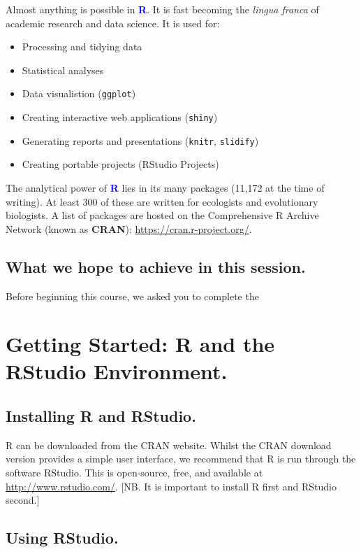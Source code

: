 \documentclass[a4paper,12pt]{article}
\newcommand\boldblue[1]{\textcolor{blue}{\textbf{#1}}}
\newcommand{\code}[1]{\texttt{#1}}
\begin{document}
Almost anything is possible in \boldblue{R}. It is fast becoming the \textit{lingua franca} of academic research and data science. It is used for:

\begin{itemize}
\item Processing and tidying data 
\item Statistical analyses
\item Data visualistion (\code{ggplot})
\item Creating interactive web applications (\code{shiny})
\item Generating reports and presentations (\code{knitr}, \code{slidify})
\item Creating portable projects (RStudio Projects)
\end{itemize}

The analytical power of \boldblue{R} lies in its many packages (11,172 at the time of writing). At least 300 of these are written for ecologists and evolutionary biologists. A list of packages are hosted on the Comprehensive R Archive Network (known as \textbf{CRAN}): \url{https://cran.r-project.org/}.

\subsection {What we hope to achieve in this session.}

Before beginning this course, we asked you to complete the 


\section {Getting Started: R and the RStudio Environment.}

\subsection {Installing R and RStudio.}

R can be downloaded from the CRAN website. Whilst the CRAN download version provides a simple user interface, we recommend that R is run through the software RStudio. This is open-source, free, and available at \url{http://www.rstudio.com/}. [NB. It is important to install R first and RStudio second.]

\subsection {Using RStudio.}
\end{document}
